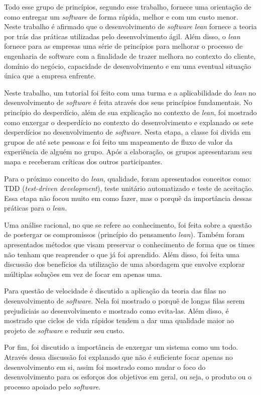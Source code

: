 Todo esse grupo de princípios, segundo esse trabalho, fornece uma orientação de como entregar um \textit{software} de forma rápida, melhor e com um custo menor. Neste trabalho é afirmado que o desenvolvimento de \textit{software lean} fornece a teoria por trás das práticas utilizadas pelo desenvolvimento ágil. Além disso, o \textit{lean} fornece para as empresas uma série de princípios para melhorar o processo de engenharia de software com a finalidade de trazer melhora no contexto do cliente, domínio do negócio, capacidade de desenvolvimento e em uma eventual situação única que a empresa enfrente.

Neste trabalho, um tutorial foi feito com uma turma e a aplicabilidade do \textit{lean} no desenvolvimento de \textit{software} é feita através dos seus princípios fundamentais. No princípio do desperdício, além de sua explicação no contexto de \textit{lean}, foi mostrado como enxergar o desperdício no contexto do desenvolvimento e explanado os sete desperdícios no desenvolvimento de \textit{software}. Nesta etapa, a classe foi divida em grupos de até sete pessoas e foi feito um mapeamento de fluxo de valor da experiência de alguém no grupo. Após a elaboração, os grupos apresentaram seu mapa e receberam críticas dos outros participantes.

Para o próximo conceito do \textit{lean}, qualidade, foram apresentados conceitos como: TDD (\textit{test-driven development}), teste unitário automatizado e teste de aceitação. Essa etapa não focou muito em como fazer, mas o porquê da importância dessas práticas para o \textit{lean}\textit{.}

Uma análise racional, no que se refere ao conhecimento, foi feita sobre a questão de postergar os compromissos (princípio do pensamento \textit{lean}). Também foram apresentados métodos que visam preservar o conhecimento de forma que os times não tenham que reaprender o que já foi aprendido. Além disso, foi feita uma discussão dos benefícios da utilização de uma abordagem que envolve explorar múltiplas soluções em vez de focar em apenas uma.

Para questão de velocidade é discutido a aplicação da teoria das filas no desenvolvimento de \textit{software}. Nela foi mostrado o porquê de longas filas serem prejudiciais ao desenvolvimento e mostrado como evita-las. Além disso, é mostrado que ciclos de vida rápidos tendem a dar uma qualidade maior ao projeto de \textit{software} e reduzir seu custo.

Por fim, foi discutido a importância de enxergar um sistema como um todo. Através dessa discussão foi explanado que não é suficiente focar apenas no desenvolvimento em si, assim foi mostrado como mudar o foco do desenvolvimento para os esforços dos objetivos em geral, ou seja, o produto ou o processo apoiado pelo \textit{software}. 

